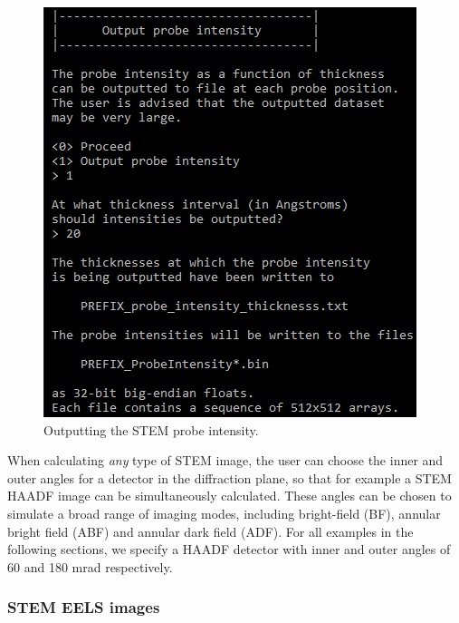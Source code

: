 \documentclass[12pt,a4paper]{article}
\begin{document}
\begin{figure}[!h]
\begin{center}
    \includegraphics[scale=0.75]{probe_intensity.png}
\caption{Outputting the STEM probe intensity.}
\label{fig:probe_intensity}
\end{center}
\end{figure}

When calculating \emph{any} type of STEM image, the user can choose the inner and outer angles for a detector in the diffraction plane, so that for example a STEM HAADF image can be simultaneously calculated.
These angles can be chosen to simulate a broad range of imaging modes, including bright-field (BF), annular bright field (ABF) and annular dark field (ADF).
For all examples in the following sections, we specify a HAADF detector with inner and outer angles of 60 and 180 mrad respectively.



\subsubsection{STEM EELS images}
\end{document}
